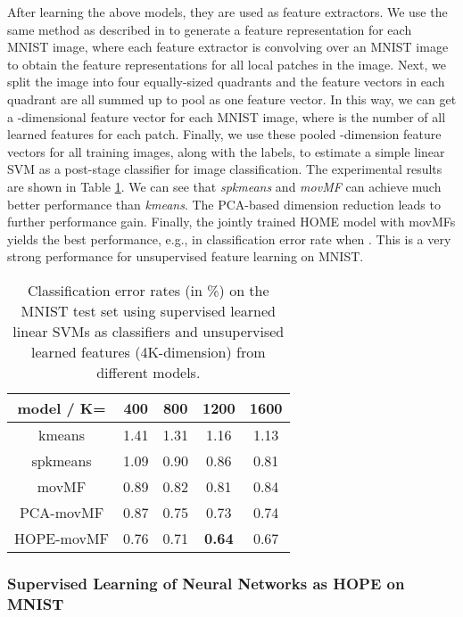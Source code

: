 \documentclass[11pt]{article}
\begin{document}
After learning the above models, they are used as feature extractors. We use the same method as described in \cite{Coates2011} to 
generate a feature representation for each MNIST image, where  each feature extractor is convolving over an MNIST image to obtain the feature representations for all local patches in the image. Next, we split the image into four equally-sized quadrants and 
the feature vectors in each quadrant are all summed up to pool as one feature vector. In this way,  we can get a -dimensional feature vector for each MNIST image, where  is the number of all learned features for each patch. Finally, we use these pooled -dimension feature vectors for all training images, along with the labels, to estimate a simple linear SVM as a post-stage classifier for image classification.  The experimental results are shown in Table \ref{MNIST_USL}. 
We can see that {\em spkmeans} and {\em movMF} can achieve much better performance than {\em kmeans}. The PCA-based dimension reduction leads to further performance gain. Finally, the jointly trained HOME model with movMFs yields the best performance, e.g.,  in classification error rate when . 
This is a very strong performance for unsupervised feature learning on MNIST.



\begin{table}
	\centering
	\caption{Classification error rates (in \%) on the MNIST test set using supervised learned linear SVMs as classifiers and unsupervised learned features (4K-dimension) from different models. }
	\begin{tabular}{|c|c|c|c|c|}
		\hline   model / K=     &  400   & 800   & 1200  & 1600  \\ 
		\hline  kmeans     & 1.41  & 1.31  & 1.16  & 1.13 \\ 
		\hline  spkmeans & 1.09  & 0.90  &  0.86 & 0.81 \\ 
	    \hline  movMF      & 0.89  & 0.82  & 0.81   & 0.84  \\ 
		\hline  PCA-movMF& 0.87 & 0.75  & 0.73 & 0.74  \\ 
		\hline\hline  HOPE-movMF& 0.76 & 0.71  & {\bf 0.64}  & 0.67 \\ 
		\hline 
	\end{tabular} 
	\label{MNIST_USL}
\end{table}

\subsubsection{Supervised Learning of Neural Networks as HOPE on MNIST}
\end{document}
